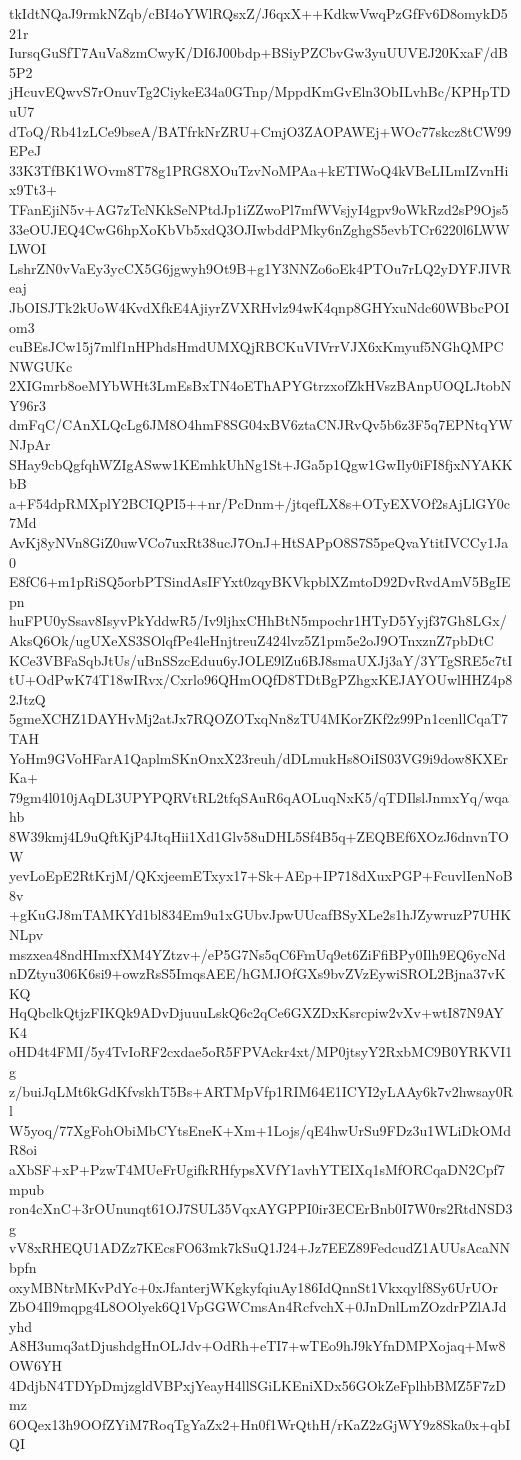 tkIdtNQaJ9rmkNZqb/cBI4oYWlRQsxZ/J6qxX++KdkwVwqPzGfFv6D8omykD521r
IursqGuSfT7AuVa8zmCwyK/DI6J00bdp+BSiyPZCbvGw3yuUUVEJ20KxaF/dB5P2
jHcuvEQwvS7rOnuvTg2CiykeE34a0GTnp/MppdKmGvEln3ObILvhBc/KPHpTDuU7
dToQ/Rb41zLCe9bseA/BATfrkNrZRU+CmjO3ZAOPAWEj+WOc77skcz8tCW99EPeJ
33K3TfBK1WOvm8T78g1PRG8XOuTzvNoMPAa+kETIWoQ4kVBeLILmIZvnHix9Tt3+
TFanEjiN5v+AG7zTcNKkSeNPtdJp1iZZwoPl7mfWVsjyI4gpv9oWkRzd2sP9Ojs5
33eOUJEQ4CwG6hpXoKbVb5xdQ3OJIwbddPMky6nZghgS5evbTCr6220l6LWWLWOI
LshrZN0vVaEy3ycCX5G6jgwyh9Ot9B+g1Y3NNZo6oEk4PTOu7rLQ2yDYFJIVReaj
JbOISJTk2kUoW4KvdXfkE4AjiyrZVXRHvlz94wK4qnp8GHYxuNdc60WBbcPOIom3
cuBEsJCw15j7mlf1nHPhdsHmdUMXQjRBCKuVIVrrVJX6xKmyuf5NGhQMPCNWGUKc
2XIGmrb8oeMYbWHt3LmEsBxTN4oEThAPYGtrzxofZkHVszBAnpUOQLJtobNY96r3
dmFqC/CAnXLQcLg6JM8O4hmF8SG04xBV6ztaCNJRvQv5b6z3F5q7EPNtqYWNJpAr
SHay9cbQgfqhWZIgASww1KEmhkUhNg1St+JGa5p1Qgw1GwIly0iFI8fjxNYAKKbB
a+F54dpRMXplY2BCIQPI5++nr/PcDnm+/jtqefLX8s+OTyEXVOf2sAjLlGY0c7Md
AvKj8yNVn8GiZ0uwVCo7uxRt38ucJ7OnJ+HtSAPpO8S7S5peQvaYtitIVCCy1Ja0
E8fC6+m1pRiSQ5orbPTSindAsIFYxt0zqyBKVkpblXZmtoD92DvRvdAmV5BgIEpn
huFPU0ySsav8IsyvPkYddwR5/Iv9ljhxCHhBtN5mpochr1HTyD5Yyjf37Gh8LGx/
AksQ6Ok/ugUXeXS3SOlqfPe4leHnjtreuZ424lvz5Z1pm5e2oJ9OTnxznZ7pbDtC
KCe3VBFaSqbJtUs/uBnSSzcEduu6yJOLE9lZu6BJ8smaUXJj3aY/3YTgSRE5c7tI
tU+OdPwK74T18wIRvx/Cxrlo96QHmOQfD8TDtBgPZhgxKEJAYOUwlHHZ4p82JtzQ
5gmeXCHZ1DAYHvMj2atJx7RQOZOTxqNn8zTU4MKorZKf2z99Pn1cenllCqaT7TAH
YoHm9GVoHFarA1QaplmSKnOnxX23reuh/dDLmukHs8OiIS03VG9i9dow8KXErKa+
79gm4l010jAqDL3UPYPQRVtRL2tfqSAuR6qAOLuqNxK5/qTDIlslJnmxYq/wqahb
8W39kmj4L9uQftKjP4JtqHii1Xd1Glv58uDHL5Sf4B5q+ZEQBEf6XOzJ6dnvnTOW
yevLoEpE2RtKrjM/QKxjeemETxyx17+Sk+AEp+IP718dXuxPGP+FcuvlIenNoB8v
+gKuGJ8mTAMKYd1bl834Em9u1xGUbvJpwUUcafBSyXLe2s1hJZywruzP7UHKNLpv
mszxea48ndHImxfXM4YZtzv+/eP5G7Ns5qC6FmUq9et6ZiFfiBPy0Ilh9EQ6ycNd
nDZtyu306K6si9+owzRsS5ImqsAEE/hGMJOfGXs9bvZVzEywiSROL2Bjna37vKKQ
HqQbclkQtjzFIKQk9ADvDjuuuLskQ6c2qCe6GXZDxKsrcpiw2vXv+wtI87N9AYK4
oHD4t4FMI/5y4TvIoRF2cxdae5oR5FPVAckr4xt/MP0jtsyY2RxbMC9B0YRKVI1g
z/buiJqLMt6kGdKfvskhT5Bs+ARTMpVfp1RIM64E1ICYI2yLAAy6k7v2hwsay0Rl
W5yoq/77XgFohObiMbCYtsEneK+Xm+1Lojs/qE4hwUrSu9FDz3u1WLiDkOMdR8oi
aXbSF+xP+PzwT4MUeFrUgifkRHfypsXVfY1avhYTEIXq1sMfORCqaDN2Cpf7mpub
ron4cXnC+3rOUnunqt61OJ7SUL35VqxAYGPPI0ir3ECErBnb0I7W0rs2RtdNSD3g
vV8xRHEQU1ADZz7KEcsFO63mk7kSuQ1J24+Jz7EEZ89FedcudZ1AUUsAcaNNbpfn
oxyMBNtrMKvPdYc+0xJfanterjWKgkyfqiuAy186IdQnnSt1Vkxqylf8Sy6UrUOr
ZbO4Il9mqpg4L8OOlyek6Q1VpGGWCmsAn4RcfvchX+0JnDnlLmZOzdrPZlAJdyhd
A8H3umq3atDjushdgHnOLJdv+OdRh+eTI7+wTEo9hJ9kYfnDMPXojaq+Mw8OW6YH
4DdjbN4TDYpDmjzgldVBPxjYeayH4llSGiLKEniXDx56GOkZeFplhbBMZ5F7zDmz
6OQex13h9OOfZYiM7RoqTgYaZx2+Hn0f1WrQthH/rKaZ2zGjWY9z8Ska0x+qbIQI
